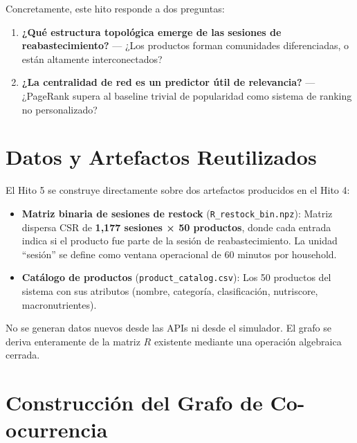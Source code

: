 \documentclass[12pt,a4paper]{article}
\newcommand{\metric}[1]{\textcolor{metricblue}{\textbf{#1}}}
\newcommand{\code}[1]{\texttt{\small #1}}
\begin{document}
Concretamente, este hito responde a dos preguntas:

\begin{enumerate}
    \item \textbf{¿Qué estructura topológica emerge de las sesiones de reabastecimiento?} — ¿Los productos forman comunidades diferenciadas, o están altamente interconectados?
    \item \textbf{¿La centralidad de red es un predictor útil de relevancia?} — ¿PageRank supera al baseline trivial de popularidad como sistema de ranking no personalizado?
\end{enumerate}

\section{Datos y Artefactos Reutilizados}

El Hito 5 se construye directamente sobre dos artefactos producidos en el Hito 4:

\begin{itemize}
    \item \textbf{Matriz binaria de sesiones de restock} (\code{R\_restock\_bin.npz}): Matriz dispersa CSR de \metric{1{,}177 sesiones × 50 productos}, donde cada entrada indica si el producto fue parte de la sesión de reabastecimiento. La unidad ``sesión'' se define como ventana operacional de 60 minutos por household.

    \item \textbf{Catálogo de productos} (\code{product\_catalog.csv}): Los 50 productos del sistema con sus atributos (nombre, categoría, clasificación, nutriscore, macronutrientes).
\end{itemize}

No se generan datos nuevos desde las APIs ni desde el simulador. El grafo se deriva enteramente de la matriz $R$ existente mediante una operación algebraica cerrada.

\section{Construcción del Grafo de Co-ocurrencia}
\end{document}
